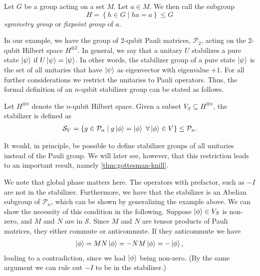 \begin{defn}\label{defn:fixpointgroup}
  Let $G$ be a group acting on a set $M$. Let $a\in M$. We then call the
  subgroup
  \[ H = \left\{ h \in G \mid ha = a \right\} \leq G \]
  \emph{symmetry group} or \emph{fixpoint group} of $a$.
\end{defn}

In our example, we have the group of $2$-qubit Pauli matrices, $\mathcal{P}_2$,
acting on the $2$-qubit Hilbert space $H^{\otimes 2}$.
In general, we say that a unitary $U$ stabilizes a pure state $\ket{\psi}$ if
$U\ket{\psi} = \ket{\psi}$. In other words, the stabilizer group of a pure
state
$\ket{\psi}$ is the set of all unitaries that have $\ket{\psi}$ as eigenvector
with eigenvalue $+1$. For all further considerations we restrict the unitaries
to Pauli operators. Thus, the formal definition of an $n$-qubit stabilizer
group can be stated as follows.

\begin{defn}\label{defn:stabilizergroup}
  Let $H^{\otimes n}$ denote the $n$-qubit Hilbert space. Given a subset $V_S
  \subseteq H^{\otimes n}$, the stabilizer is defined as
  \begin{align}
    \mathcal{S}_V = \{ g \in \mathcal{P}_n \mid g \ket{\phi} = \ket{\phi} \
    \forall \ket{\phi} \in V \} \leq \mathcal{P}_n
  .\end{align}
\end{defn}

It would, in principle, be possible to define stabilizer groups of all
unitaries instead of the Pauli group. We will later see, however, that this
restriction leads to an important result, namely \cref{thm:gottesman-knill}.

We note that global phase matters here. The operators with prefactor, such as
$-I$ are not in the stabilizer. Furthermore, we have that the stabilizer is an
Abelian subgroup of $\mathcal{P}_n$, which can be shown by generalizing the
example above. We can show the necessity of this condition in the following.
Suppose $\ket{\phi}\in V_S$ is non-zero, and $M$ and $N$ are in $\mathcal{S}$. Since $M$
and $N$ are tensor products of Pauli matrices, they either commute or
anticommute. If they anticommute we have
\begin{align}
  \ket{\phi} = MN\ket{\phi} = -NM\ket{\phi} = -\ket{\phi}
,\end{align}
leading to a contradiction, since we had $\ket{\phi}$ being non-zero. (By the
same argument we can rule out $-I$ to be in the stabilizer.)

